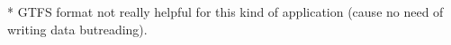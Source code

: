 * GTFS format not really helpful for this kind of application (cause no need of writing data butreading).
